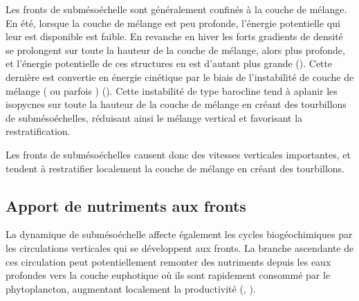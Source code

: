 Les fronts de submésoéchelle sont généralement confinés à la couche de mélange.
En été, lorsque la couche de mélange est peu profonde, l'énergie potentielle qui leur est disponible est faible.
En revanche en hiver les forts gradients de densité se prolongent sur toute la hauteur de la couche de mélange, alors plus profonde, et l'énergie potentielle de ces structures en est d'autant plus grande (\cite{mensa_2013,callies_2015,buckingham_2016,sasaki_2020}).
Cette dernière est convertie en énergie cinétique par le biais de l'instabilité de couche de mélange ( ou parfois ) (\cite{boccaletti_2007,fox-kemper_2008}).
Cette instabilité de type barocline tend à aplanir les isopycnes sur toute la hauteur de la couche de mélange en créant des tourbillons de submésoéchelles, réduisant ainsi le mélange vertical et favorisant la restratification.


Les fronts de submésoéchelles causent donc des vitesses verticales importantes, et tendent à restratifier localement la couche de mélange en créant des tourbillons.

\subsection{Apport de nutriments aux fronts}
\label{sec:upwelling-nutriments}

La dynamique de submésoéchelle affecte également les cycles biogéochimiques par les circulations verticales qui se développent aux fronts.
La branche ascendante de ces circulation peut potentiellement remonter des nutriments depuis les eaux profondes vers la couche euphotique où ils sont rapidement consommé par le phytoplancton, augmentant localement la productivité (, \cite{klein_2009,calil_2011,mahadevan_2000,mahadevan_2016,mcwilliams_2016,levy_2001,levy_2012,levy_2018}).

